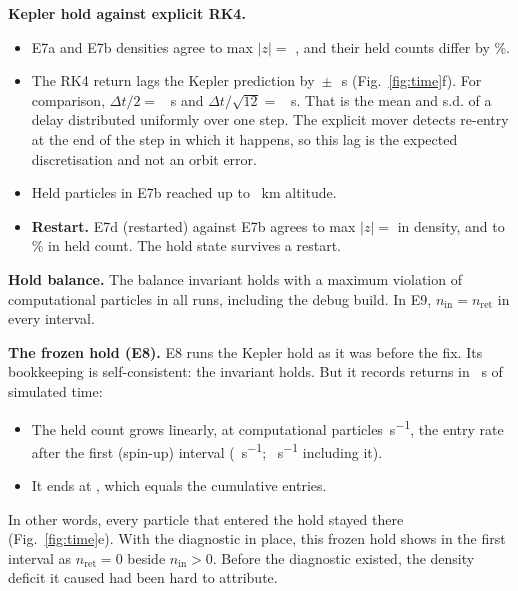 \documentclass[10pt]{article}
\newcommand{\para}[1]{\textbf{#1}\hspace{0.5em}}
\newcommand{\sinv}{s\textsuperscript{−1}}
\begin{document}
\para{Kepler hold against explicit RK4.}
\begin{itemize}
  \item E7a and E7b densities agree to max $|z| = $ \verKvsEZ{}, and their held counts differ by \verKvsEHeld{}\%.
  \item The RK4 return lags the Kepler prediction by \verDelayMean{}\,$\pm$\,\verDelayStd{}~s (Fig.~\ref{fig:time}f). For comparison, $\Delta t/2 = $ \verHalfDt{}~s and $\Delta t/\sqrt{12} = $ \verDelayUniformStd{}~s. That is the mean and s.d. of a delay distributed uniformly over one step. The explicit mover detects re-entry at the end of the step in which it happens, so this lag is the expected discretisation and not an orbit error.
  \item Held particles in E7b reached up to \verRheldMax{}~km altitude.
  \item \textbf{Restart.} E7d (restarted) against E7b agrees to max $|z| = $ \verRestartZ{} in density, and to \verRestartHeld{}\% in held count. The hold state survives a restart.
\end{itemize}

\para{Hold balance.} The balance invariant holds with a maximum violation of \verViolMax{} computational particles in all \verNHoldRuns{} runs, including the debug build. In E9, $n_\mathrm{in} = n_\mathrm{ret}$ in every interval.

\para{The frozen hold (E8).} E8 runs the Kepler hold as it was before the fix. Its bookkeeping is self-consistent: the invariant holds. But it records \eightReturns{} returns in \eightTend{}~s of simulated time:
\begin{itemize}
  \item The held count grows linearly, at \eightGrowth{} computational particles~\sinv{}, the entry rate after the first (spin-up) interval (\eightEntrySteady{}~\sinv{}; \eightEntry{}~\sinv{} including it).
  \item It ends at \eightHeldEnd{}, which equals the cumulative entries.
\end{itemize}
In other words, every particle that entered the hold stayed there (Fig.~\ref{fig:time}e). With the diagnostic in place, this frozen hold shows in the first interval as $n_\mathrm{ret} = 0$ beside $n_\mathrm{in} > 0$. Before the diagnostic existed, the density deficit it caused had been hard to attribute.
\end{document}
